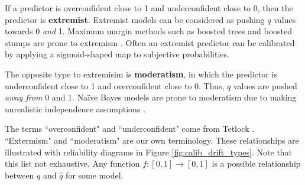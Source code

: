 If a predictor is overconfident close to 1 and underconfident close to 0, then the predictor is {\bf extremist}. Extremist models can be considered as pushing $q$ values towards 0 {\it and} 1. Maximum margin methods such as boosted trees and boosted stumps are prone to extremism \cite{calibrating}. Often an extremist predictor can be calibrated by applying a sigmoid-shaped map to subjective probabilities.

The opposite type to extremisim is {\bf moderatism}, in which the predictor is underconfident close to 1 and overconfident close to 0. Thus, $q$ values are pushed {\it away from} 0 and 1. Na\"{i}ve Bayes models are prone to moderatism due to making unrealistic independence assumptions \cite{calibrating}. 

The terms ``overconfident" and ``underconfident" come from Tetlock \cite{superforecasting}. ``Extermism" and ``moderatism" are our own terminology. These relationships are illustrated with reliability diagrams in Figure \ref{fig:calib_drift_types}. Note that this list not exhaustive. Any function $f:[0,1]\rightarrow[0,1]$ is a possible relationship between $q$ and $\hat{q}$ for some model.

